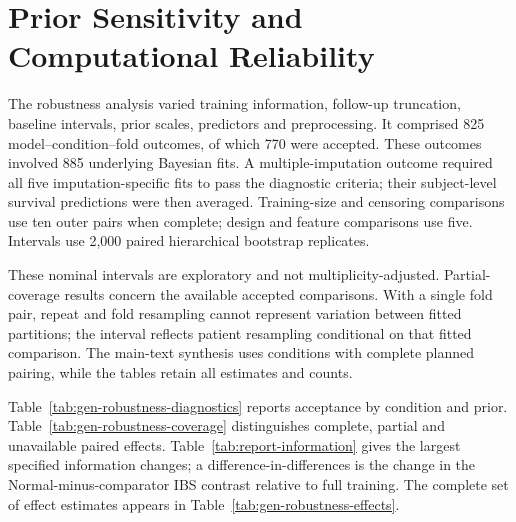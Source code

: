 \chapter{Prior Sensitivity and Computational Reliability}\label{appendix-j-prior-sensitivity-and-final-computational-integrity}\label{app:robustness}

The robustness analysis varied training information, follow-up truncation, baseline intervals, prior scales, predictors and preprocessing. It comprised 825 model--condition--fold outcomes, of which 770 were accepted. These outcomes involved 885 underlying Bayesian fits. A multiple-imputation outcome required all five imputation-specific fits to pass the diagnostic criteria; their subject-level survival predictions were then averaged. Training-size and censoring comparisons use ten outer pairs when complete; design and feature comparisons use five. Intervals use 2,000 paired hierarchical bootstrap replicates.

These nominal intervals are exploratory and not multiplicity-adjusted. Partial-coverage results concern the available accepted comparisons. With a single fold pair, repeat and fold resampling cannot represent variation between fitted partitions; the interval reflects patient resampling conditional on that fitted comparison. The main-text synthesis uses conditions with complete planned pairing, while the tables retain all estimates and counts.

Table~\ref{tab:gen-robustness-diagnostics} reports acceptance by condition and prior. Table~\ref{tab:gen-robustness-coverage} distinguishes complete, partial and unavailable paired effects. Table~\ref{tab:report-information} gives the largest specified information changes; a difference-in-differences is the change in the Normal-minus-comparator IBS contrast relative to full training. The complete set of effect estimates appears in Table~\ref{tab:gen-robustness-effects}.





\clearpage
\begin{landscape}

\end{landscape}
